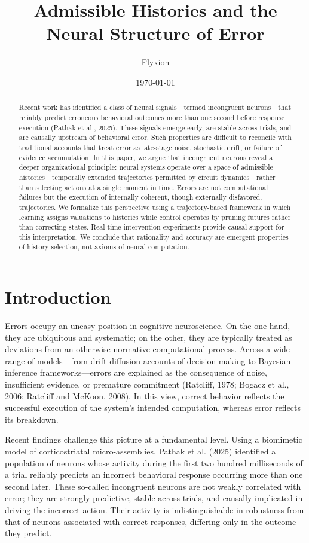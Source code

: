 \documentclass[11pt]{article}
\title{Admissible Histories and the Neural Structure of Error}
\author{Flyxion}
\date{\today}
\begin{document}
\maketitle

\begin{abstract}
Recent work has identified a class of neural signals—termed incongruent neurons—that reliably predict erroneous behavioral outcomes more than one second before response execution (Pathak et al., 2025). These signals emerge early, are stable across trials, and are causally upstream of behavioral error. Such properties are difficult to reconcile with traditional accounts that treat error as late-stage noise, stochastic drift, or failure of evidence accumulation. In this paper, we argue that incongruent neurons reveal a deeper organizational principle: neural systems operate over a space of admissible histories—temporally extended trajectories permitted by circuit dynamics—rather than selecting actions at a single moment in time. Errors are not computational failures but the execution of internally coherent, though externally disfavored, trajectories. We formalize this perspective using a trajectory-based framework in which learning assigns valuations to histories while control operates by pruning futures rather than correcting states. Real-time intervention experiments provide causal support for this interpretation. We conclude that rationality and accuracy are emergent properties of history selection, not axioms of neural computation.
\end{abstract}

\section{Introduction}

Errors occupy an uneasy position in cognitive neuroscience. On the one hand, they are ubiquitous and systematic; on the other, they are typically treated as deviations from an otherwise normative computational process. Across a wide range of models—from drift-diffusion accounts of decision making to Bayesian inference frameworks—errors are explained as the consequence of noise, insufficient evidence, or premature commitment (Ratcliff, 1978; Bogacz et al., 2006; Ratcliff and McKoon, 2008). In this view, correct behavior reflects the successful execution of the system’s intended computation, whereas error reflects its breakdown.

Recent findings challenge this picture at a fundamental level. Using a biomimetic model of corticostriatal micro-assemblies, Pathak et al. (2025) identified a population of neurons whose activity during the first two hundred milliseconds of a trial reliably predicts an incorrect behavioral response occurring more than one second later. These so-called incongruent neurons are not weakly correlated with error; they are strongly predictive, stable across trials, and causally implicated in driving the incorrect action. Their activity is indistinguishable in robustness from that of neurons associated with correct responses, differing only in the outcome they predict.
\end{document}
